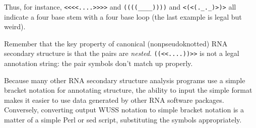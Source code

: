 Thus, for instance, \verb+<<<<....>>>>+ and \verb+((((____))))+ and
\verb+<(<(._._)>)>+ all indicate a four base stem with a four base
loop (the last example is legal but weird).

Remember that the key property of canonical (nonpseudoknotted) RNA
secondary structure is that the pairs are \emph{nested}.
\verb+((<<....))>>+ is not a legal annotation string: the pair symbols
don't match up properly. 

Because many other RNA secondary structure analysis programs use a
simple bracket notation for annotating structure, the ability to input
the simple format makes it easier to use data generated by other RNA
software packages. Conversely, converting output WUSS notation to
simple bracket notation is a matter of a simple Perl or sed script,
substituting the symbols appropriately.
